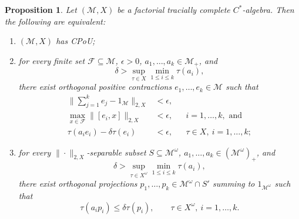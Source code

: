 \documentclass[a4paper,11pt]{amsart}
\newtheorem{proposition}[theorem]{Proposition}
\theoremstyle{definition}
\numberwithin{equation}{section}
\numberwithin{theorem}{section}
\newcommand{\M}{\mathcal{M}}
\begin{document}
\begin{proposition}\label{CPoU:Ultra:FiniteSet}
	Let $(\M, X)$ be a factorial tracially complete $C^*$-algebra. Then the following are equivalent:
	\begin{enumerate}[wide, labelwidth=0pt, labelindent=0pt]
		\item\label{item:CPOU} $(\M,X)$ has CPoU;
		\item\label{item:CPOU-local} 
		for every finite set $\mathcal F \subseteq \M$, $\epsilon>0$, $a_1,\dots,a_k \in \M_+$, and 
	\begin{equation}
		\delta>\sup_{\tau\in X}\min_{1 \leq i \leq k}\tau(a_i),
	\end{equation}
	there exist orthogonal positive contractions $e_1,\dots,e_k \in \M$ such that
	\begin{equation}\begin{aligned}\label{eqn:CPoU-local-form}
		\Big\|\sum_{j=1}^ke_j - 1_\M \Big\|_{2,X} &< \epsilon, && \\
		\max_{x \in \mathcal F} \|[e_i,x]\|_{2,X} &<\epsilon,   && i=1,\dots,k, \text{ and} \\
		\tau(a_ie_i) - \delta\tau(e_i) &< \epsilon,  && \tau \in X,\ i=1,\dots,k;
	\end{aligned}\end{equation}
	\item\label{item:CPOU++} 
		for every $\|\cdot\|_{2,X}$-separable subset $S \subseteq \M^\omega$, $a_1,\dots,a_k \in (\M^\omega)_+$, and
	\begin{equation}\label{eq:CPoU++TraceIneq1}
		\delta > \sup_{\tau \in X^\omega} \min_{1 \leq i \leq k}\tau(a_i),
	\end{equation}
	there exist orthogonal projections $p_1,\dots,p_k\in \M^\omega\cap S'$ summing to $1_{\M^\omega}$ such that
	\begin{equation}\label{eq:CPoU++TraceIneq2}
		\tau(a_ip_i)\leq \delta\tau(p_i),\qquad \tau\in X^\omega,\ i=1,\dots,k.
	\end{equation}
	\end{enumerate}
\end{proposition}
\end{document}
